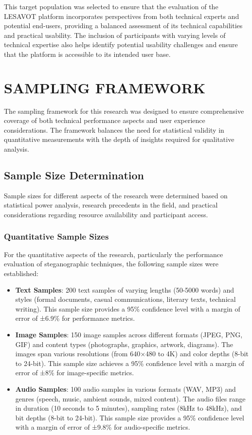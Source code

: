 \documentclass[12pt, a4paper, oneside]{book}
\begin{document}
This target population was selected to ensure that the evaluation of the LESAVOT platform incorporates perspectives from both technical experts and potential end-users, providing a balanced assessment of its technical capabilities and practical usability. The inclusion of participants with varying levels of technical expertise also helps identify potential usability challenges and ensure that the platform is accessible to its intended user base.

\section{SAMPLING FRAMEWORK}

The sampling framework for this research was designed to ensure comprehensive coverage of both technical performance aspects and user experience considerations. The framework balances the need for statistical validity in quantitative measurements with the depth of insights required for qualitative analysis.

\subsection{Sample Size Determination}

Sample sizes for different aspects of the research were determined based on statistical power analysis, research precedents in the field, and practical considerations regarding resource availability and participant access.

\subsubsection{Quantitative Sample Sizes}
For the quantitative aspects of the research, particularly the performance evaluation of steganographic techniques, the following sample sizes were established:

\begin{itemize}[leftmargin=*]
    \item \textbf{Text Samples}: 200 text samples of varying lengths (50-5000 words) and styles (formal documents, casual communications, literary texts, technical writing). This sample size provides a 95\% confidence level with a margin of error of ±6.9\% for performance metrics.

    \item \textbf{Image Samples}: 150 image samples across different formats (JPEG, PNG, GIF) and content types (photographs, graphics, artwork, diagrams). The images span various resolutions (from 640×480 to 4K) and color depths (8-bit to 24-bit). This sample size achieves a 95\% confidence level with a margin of error of ±8\% for image-specific metrics.

    \item \textbf{Audio Samples}: 100 audio samples in various formats (WAV, MP3) and genres (speech, music, ambient sounds, mixed content). The audio files range in duration (10 seconds to 5 minutes), sampling rates (8kHz to 48kHz), and bit depths (8-bit to 24-bit). This sample size provides a 95\% confidence level with a margin of error of ±9.8\% for audio-specific metrics.
\end{itemize}
\end{document}
